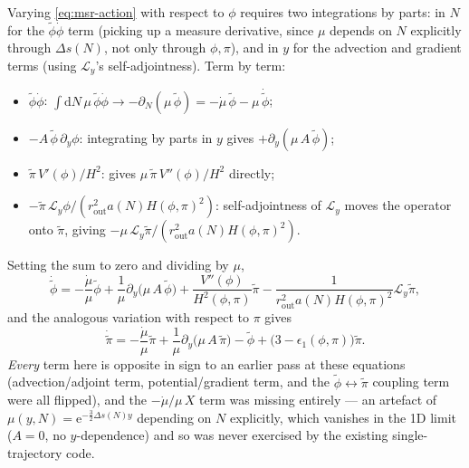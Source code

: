 \documentclass[a4paper,11pt]{article}
\newcommand{\semibold}[1]{{\fontseries{b}\selectfont{#1}}}
\renewcommand{\d}{\mathrm{d}}
\newcommand{\e}[1]{\mathrm{e}^{{#1}}}
\newenvironment{calculation}{\begin{tcolorbox}[enhanced,breakable,colback=SussexPowderBlue!10,colframe=SussexCobaltBlue!30]\small}{\end{tcolorbox}}
\newcommand{\Ny}{N}                          %
\newcommand{\epsSR}{\epsilon_1}              %
\newcommand{\Hub}{H}                         %
\newcommand{\sfactor}{a}                     %
\newcommand{\atloc}{(\field,\mom)}           %
\newcommand{\field}{\phi}                    %
\newcommand{\mom}{\pi}                       %
\newcommand{\Vpot}{V}                        %
\newcommand{\rfield}{\widetilde\field}       %
\newcommand{\rmom}{\widetilde\mom}           %
\newcommand{\rad}{r}                         %
\newcommand{\yco}{y}                         %
\newcommand{\rout}{\rad_{\mathrm{out}}}      %
\newcommand{\aHloc}{\sfactor(\Ny)\Hub\atloc} %
\newcommand{\Deltas}{\Delta s}                %
\newcommand{\measure}{\mu}                   %
\newcommand{\advcoef}{A}                     %
\newcommand{\Lop}{\mathcal{L}_\yco}          %
\begin{document}
\begin{calculation}
\semibold{Response-field equations: direct re-derivation.} Varying
\eqref{eq:msr-action} with respect to $\field$ requires two integrations
by parts: in $\Ny$ for the $\rfield\dot\field$ term (picking up a measure
derivative, since $\measure$ depends on $\Ny$ explicitly through
$\Deltas(\Ny)$, not only through $\field,\mom$), and in $\yco$ for the
advection and gradient terms (using $\Lop$'s self-adjointness). Term by
term:
\begin{itemize}
    \item $\rfield\dot\field$: $\int\d\Ny\,\measure\,\rfield\dot\field
        \to -\partial_\Ny(\measure\,\rfield) = -\dot\measure\,\rfield-\measure\,\dot{\rfield}$;
    \item $-\advcoef\,\rfield\,\partial_\yco\field$: integrating by parts
        in $\yco$ gives $+\partial_\yco(\measure\,\advcoef\,\rfield)$;
    \item $\rmom\,\Vpot'(\field)/\Hub^2$: gives $\measure\,\rmom\,\Vpot''(\field)/\Hub^2$ directly;
    \item $-\rmom\,\Lop\field/(\rout^2\aHloc^2)$: self-adjointness of $\Lop$
        moves the operator onto $\rmom$, giving $-\measure\,\Lop\rmom/(\rout^2\aHloc^2)$.
\end{itemize}
Setting the sum to zero and dividing by $\measure$,
\begin{equation}
    \dot{\rfield}
    =
    -\frac{\dot\measure}{\measure}\rfield
    + \frac{1}{\measure}\partial_\yco\big(\measure\,\advcoef\,\rfield\big)
    + \frac{\Vpot''(\field)}{\Hub^2\atloc}\rmom
    - \frac{1}{\rout^2\aHloc^2}\Lop\rmom ,
\end{equation}
and the analogous variation with respect to $\mom$ gives
\begin{equation}
    \dot{\rmom}
    =
    -\frac{\dot\measure}{\measure}\rmom
    + \frac{1}{\measure}\partial_\yco\big(\measure\,\advcoef\,\rmom\big)
    - \rfield + \big(3-\epsSR\atloc\big)\rmom .
\end{equation}
\emph{Every} term here is opposite in sign to an earlier pass at these
equations (advection/adjoint term, potential/gradient term, and the
$\rfield\leftrightarrow\rmom$ coupling term were all flipped), and the
$-\dot\measure/\measure\,X$ term was missing entirely --- an artefact of
$\measure(\yco,\Ny)=\e{-\frac32\Deltas(\Ny)\yco}$ depending on $\Ny$
explicitly, which vanishes in the 1D limit ($\advcoef=0$, no
$\yco$-dependence) and so was never exercised by the existing
single-trajectory code.


\end{calculation}
\end{document}
